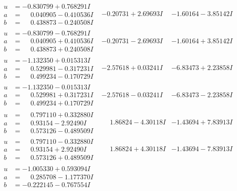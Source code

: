 \documentclass[1p]{elsarticle_modified}
\theoremstyle{definition}
\begin{document}
$$\begin{array}{c|c|c}
\begin{aligned}
u &= -0.830799 + 0.768291 I \\
a &= \phantom{-}0.040905 - 0.410536 I \\
b &= \phantom{-}0.438873 - 0.240508 I\end{aligned}
 & -0.20731 + 2.69693 I & -1.60164 - 3.85142 I \\ \hline\begin{aligned}
u &= -0.830799 - 0.768291 I \\
a &= \phantom{-}0.040905 + 0.410536 I \\
b &= \phantom{-}0.438873 + 0.240508 I\end{aligned}
 & -0.20731 - 2.69693 I & -1.60164 + 3.85142 I \\ \hline\begin{aligned}
u &= -1.132350 + 0.015313 I \\
a &= \phantom{-}0.529981 - 0.317231 I \\
b &= \phantom{-}0.499234 - 0.170729 I\end{aligned}
 & -2.57618 + 0.03241 I & -6.83473 + 2.23858 I \\ \hline\begin{aligned}
u &= -1.132350 - 0.015313 I \\
a &= \phantom{-}0.529981 + 0.317231 I \\
b &= \phantom{-}0.499234 + 0.170729 I\end{aligned}
 & -2.57618 - 0.03241 I & -6.83473 - 2.23858 I \\ \hline\begin{aligned}
u &= \phantom{-}0.797110 + 0.332880 I \\
a &= \phantom{-}0.93154 - 2.92490 I \\
b &= \phantom{-}0.573126 - 0.489509 I\end{aligned}
 & \phantom{-}1.86824 - 4.30118 I & -1.43694 + 7.83913 I \\ \hline\begin{aligned}
u &= \phantom{-}0.797110 - 0.332880 I \\
a &= \phantom{-}0.93154 + 2.92490 I \\
b &= \phantom{-}0.573126 + 0.489509 I\end{aligned}
 & \phantom{-}1.86824 + 4.30118 I & -1.43694 - 7.83913 I \\ \hline\begin{aligned}
u &= -1.005330 + 0.593094 I \\
a &= \phantom{-}0.285708 - 1.177370 I \\
b &= -0.222145 - 0.767554 I\end{aligned}

\end{array}$$
\end{document}
